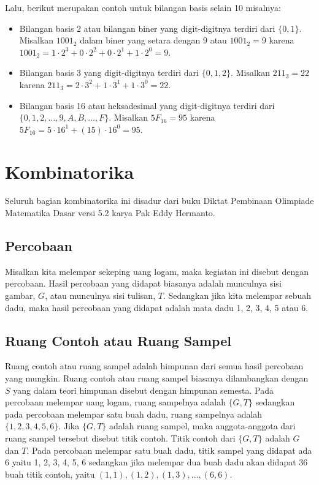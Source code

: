 \documentclass[11pt]{scrartcl}
\begin{document}
    Lalu, berikut merupakan contoh untuk bilangan basis selain 10 misalnya: 
    \begin{itemize}
        \item Bilangan basis 2 atau bilangan biner yang digit-digitnya terdiri dari $\{0,1\}$. Misalkan $1001_2$ dalam biner yang setara dengan $9$ atau $1001_2 = 9$ karena $1001_2 = 1\cdot 2^3+0\cdot 2^2+0\cdot 2^1+1\cdot 2^0 = 9$. 
        \item Bilangan basis 3 yang digit-digitnya terdiri dari $\{0,1,2\}$. Misalkan $211_3 = 22$ karena $211_3 = 2\cdot 3^2+ 1\cdot 3^1+ 1\cdot 3^0 = 22$.
        \item Bilangan basis 16 atau heksadesimal yang digit-digitnya terdiri dari $\{0,1,2,\dots,9,A,B,\dots,F\}$. Misalkan $5F_{16} = 95$ karena $5F_{16} = 5 \cdot 16^1 + (15)\cdot 16^0 = 95$.
    \end{itemize}
   
    \section{Kombinatorika}
    Seluruh bagian kombinatorika ini disadur dari buku Diktat Pembinaan Olimpiade Matematika Dasar versi 5.2 karya Pak Eddy Hermanto.
    
    \subsection{Percobaan}
Misalkan kita melempar sekeping uang logam, maka kegiatan ini disebut dengan percobaan. Hasil 
percobaan yang didapat biasanya adalah munculnya sisi gambar, $G$, atau munculnya sisi tulisan, $T$. 
Sedangkan jika kita melempar sebuah dadu, maka hasil percobaan yang didapat adalah mata dadu 1, 
2, 3, 4, 5 atau 6. 

\subsection{Ruang Contoh atau Ruang Sampel} 
Ruang contoh atau ruang sampel adalah himpunan dari semua hasil percobaan yang mungkin. Ruang 
contoh atau ruang sampel biasanya dilambangkan dengan $S$ yang dalam teori himpunan disebut 
dengan himpunan semesta. 
Pada percobaan melempar uang logam, ruang sampelnya adalah $\{G, T\}$ sedangkan pada percobaan
melempar satu buah dadu, ruang sampelnya adalah $\{1, 2, 3, 4, 5, 6\}$. 
Jika $\{G, T\}$ adalah ruang sampel, maka anggota-anggota dari ruang sampel tersebut disebut titik
contoh. Titik contoh dari $\{G, T\}$ adalah $G$ dan $T$. Pada percobaan melempar satu buah dadu, titik 
sampel yang didapat ada 6 yaitu 1, 2, 3, 4, 5, 6 sedangkan jika melempar dua buah dadu akan didapat
36 buah titik contoh, yaitu $(1, 1), (1, 2), (1, 3), \dots , (6, 6)$. 
\end{document}
